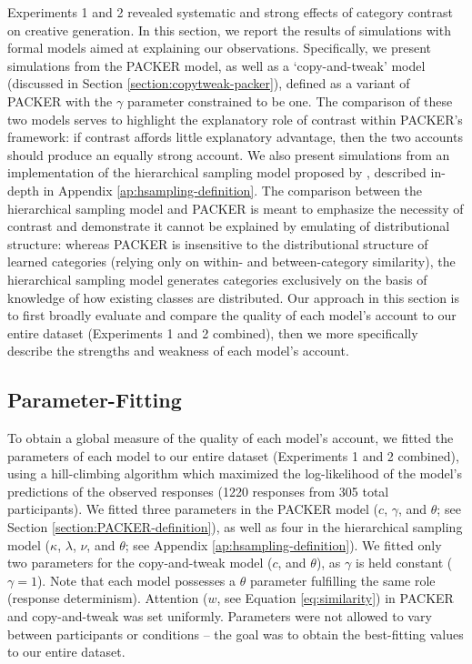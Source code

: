 \documentclass[12pt]{article}
\begin{document}
\begin{flushleft}
Experiments 1 and 2 revealed systematic and strong effects of category contrast on creative generation. In this section, we report the results of simulations with formal models aimed at explaining our observations. Specifically, we present simulations from the PACKER model, as well as a `copy-and-tweak' model (discussed in Section \ref{section:copytweak-packer}), defined as a variant of PACKER with the $\gamma$ parameter constrained to be one. The comparison of these two models serves to highlight the explanatory role of contrast within PACKER's framework: if contrast affords little explanatory advantage, then the two accounts should produce an equally strong account. We also present simulations from an implementation of the hierarchical sampling model proposed by \cite{jern2013probabilistic}, described in-depth in Appendix \ref{ap:hsampling-definition}. The comparison between the hierarchical sampling model and PACKER is meant to emphasize the necessity of contrast and demonstrate it cannot be explained by emulating of distributional structure: whereas PACKER is insensitive to the distributional structure of learned categories (relying only on within- and between-category similarity), the hierarchical sampling model generates categories exclusively on the basis of knowledge of how existing classes are distributed. Our approach in this section is to first broadly evaluate and compare the quality of each model's account to our entire dataset (Experiments 1 and 2 combined), then we more specifically describe the strengths and weakness of each model's account.

\subsection{Parameter-Fitting}

To obtain a global measure of the quality of each model's account, we fitted the parameters of each model to our entire dataset (Experiments 1 and 2 combined), using a hill-climbing algorithm which maximized the log-likelihood of the model's predictions of the observed responses (1220 responses from 305 total participants). We fitted three parameters in the PACKER model ($c$, $\gamma$, and $\theta$; see Section \ref{section:PACKER-definition}), as well as four in the hierarchical sampling model ($\kappa$, $\lambda$, $\nu$, and $\theta$; see Appendix \ref{ap:hsampling-definition}). We fitted only two parameters for the copy-and-tweak model ($c$, and $\theta$), as $\gamma$ is held constant ($\gamma = 1$). Note that each model possesses a $\theta$ parameter fulfilling the same role (response determinism). Attention ($w$, see Equation \ref{eq:similarity}) in PACKER and copy-and-tweak was set uniformly. Parameters were not allowed to vary between participants or conditions -- the goal was to obtain the best-fitting values to our entire dataset.


\end{flushleft}
\end{document}

